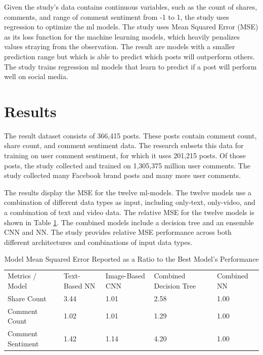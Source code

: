 \documentclass{article}
\begin{document}
Given the study's data contains continuous variables, such as the count of shares, comments, and range of comment sentiment from -1 to 1, the study uses regression to optimize the ml models. The study uses Mean Squared Error (MSE) as its loss function for the machine learning models, which heavily penalizes values straying from the observation. The result are models with a smaller prediction range but which is able to predict which posts will outperform others. The study trains regression ml models that learn to predict if a post will perform well on social media.

\section{Results}
The result dataset consists of 366,415 posts. These posts contain comment count, share count, and comment sentiment data. The research subsets this data for training on user comment sentiment, for which it uses 201,215 posts. Of those posts, the study collected and trained on 1,305,375 million user comments. The study collected many Facebook brand posts and many more user comments.

The results display the MSE for the twelve ml-models. The twelve models use a combination of different data types as input, including only-text, only-video, and a combination of text and video data. The relative MSE for the twelve models is shown in Table \ref{mse_ratios}. The combined models include a decision tree and an ensemble CNN and NN. The study provides relative MSE performance across both different architectures and combinations of input data types.

\begin{table}[]
\centering
\begin{tabular}{lllll}
Metrics / Model & Text-Based NN & Image-Based CNN & Combined Decision Tree & Combined NN \\
Share Count       & 3.44 & 1.01 & 2.58 & 1.00 \\
Comment Count     & 1.02 & 1.01 & 1.29 & 1.00 \\
Comment Sentiment & 1.42 & 1.14 & 4.20 & 1.00
\end{tabular}
\caption{\label{mse_ratios}Model Mean Squared Error Reported as a Ratio to the Best Model's Performance}
\end{table}

\end{document}
